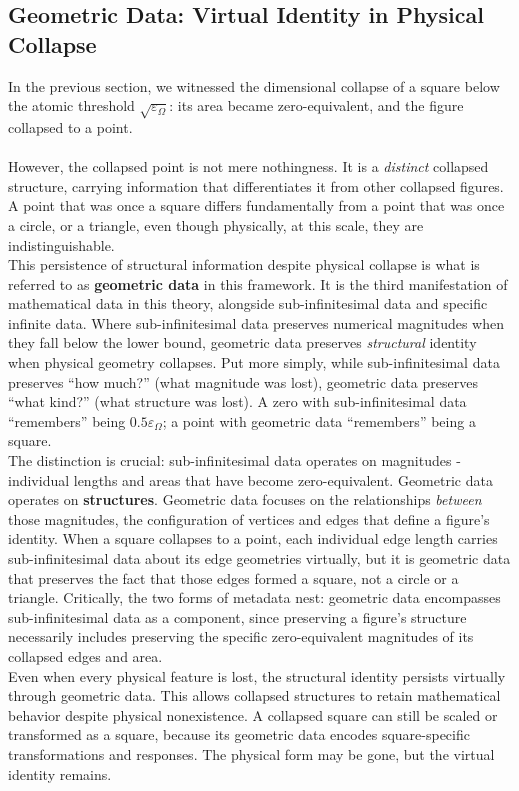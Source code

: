 \documentclass{article}
\begin{document}
\subsection{Geometric Data: Virtual Identity in Physical Collapse}

In the previous section, we witnessed the dimensional collapse of a square 
below the atomic threshold $\sqrt{\varepsilon_\Omega}$: its area became 
zero-equivalent, and the figure collapsed to a point. 
\\\\However, the collapsed point is not mere nothingness. It is a 
\textit{distinct} collapsed structure, carrying information that 
differentiates it from other collapsed figures. A point that was once a 
square differs fundamentally from a point that was once a circle, or a 
triangle, even though physically, at this scale, they are 
indistinguishable.
\\This persistence of structural information despite physical collapse is 
what is referred to as \textbf{geometric data} in this framework. It is 
the third manifestation of mathematical data in this theory, alongside 
sub-infinitesimal data and specific infinite data. Where sub-infinitesimal 
data preserves numerical magnitudes when they fall below the lower bound, 
geometric data preserves \textit{structural} identity when physical geometry 
collapses. Put more simply, while sub-infinitesimal data preserves 
``how much?'' (what magnitude was lost),  geometric data preserves 
``what kind?'' (what structure was lost). A zero with sub-infinitesimal 
data ``remembers'' being $0.5\varepsilon_\Omega$; a point with geometric 
data ``remembers'' being a square.
\\The distinction is crucial: sub-infinitesimal data operates on 
magnitudes - individual lengths and areas that have become 
zero-equivalent. Geometric data operates on \textbf{structures}. Geometric data focuses on the relationships \textit{between} those magnitudes, the configuration of vertices 
and edges that define a figure's identity. When a square collapses to a 
point, each individual edge length carries sub-infinitesimal data about 
its edge geometries virtually, but it is geometric data that preserves 
the fact that those edges formed a square, not a circle or a triangle. 
Critically, the two forms of metadata nest: geometric data encompasses 
sub-infinitesimal data as a component, since preserving a figure's 
structure necessarily includes preserving the specific zero-equivalent 
magnitudes of its collapsed edges and area.
\\Even when every physical feature is lost, the structural identity 
persists virtually through geometric data. This allows collapsed 
structures to retain mathematical behavior despite physical 
nonexistence. A collapsed square can still be scaled or transformed as 
a square, because its geometric data encodes square-specific 
transformations and responses. The physical form may be gone, but the 
virtual identity remains.
\end{document}
